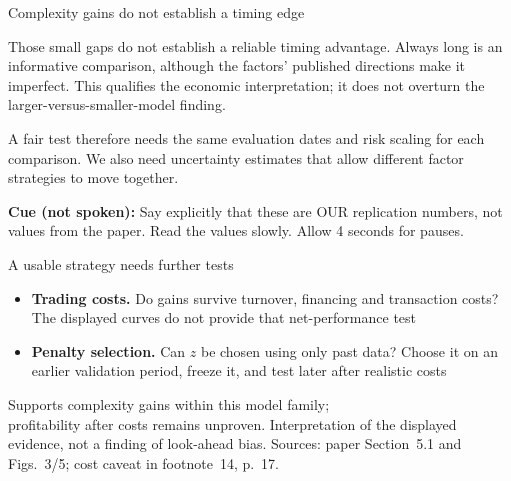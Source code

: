 \documentclass[aspectratio=169,10pt]{beamer}
\begin{document}
\begin{frame}[t,label=hao-critique-benchmark]{Complexity gains do not establish a timing edge}
{\par
Those small gaps do not establish a reliable timing advantage. Always long is an informative comparison, although the factors' published directions make it imperfect. This qualifies the economic interpretation; it does not overturn the larger-versus-smaller-model finding.
\par
A fair test therefore needs the same evaluation dates and risk scaling for each comparison. We also need uncertainty estimates that allow different factor strategies to move together.
\par\textbf{Cue (not spoken):} Say explicitly that these are OUR replication numbers, not values from the paper. Read the values slowly. Allow 4 seconds for pauses.
}
\end{frame}

\begin{frame}[t,label=hao-critique-practice]{A usable strategy needs further tests}
\begin{itemize}
  \item \textbf{Trading costs.} Do gains survive turnover, financing and transaction costs? The displayed curves do not provide that net-performance test
  \vspace{9pt}
  \item \textbf{Penalty selection.} Can $z$ be chosen using only past data? Choose it on an earlier validation period, freeze it, and test later after realistic costs
\end{itemize}
\vspace{10pt}
\alert{Supports complexity gains within this model family;}\\
profitability after costs remains unproven.
\vfill
{\scriptsize Interpretation of the displayed evidence, not a finding of look-ahead bias. Sources: paper Section~5.1 and Figs.~3/5; cost caveat in footnote~14, p.~17.}
\end{frame}
\end{document}

